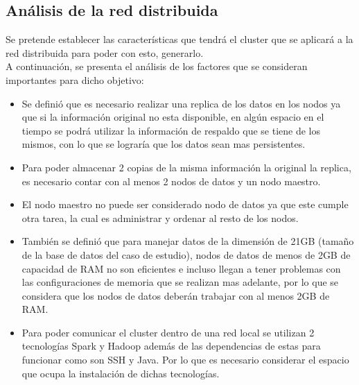 \subsection{Análisis de la red distribuida}
Se pretende establecer las características que tendrá el cluster que se aplicará a la red distribuida para poder con esto, generarlo. 
\\
A continuación, se presenta el análisis de los factores que se consideran importantes para dicho objetivo: 
\\
\begin{itemize}
\item Se definió que es necesario realizar una replica de los datos en los nodos ya que si la información original no esta disponible, en algún espacio en el tiempo se podrá utilizar la información de respaldo que se tiene de los mismos, con lo que se lograría que los datos sean mas persistentes.

\item Para poder almacenar 2 copias de la misma información la original  la replica, es necesario contar con al menos 2 nodos de datos y un nodo maestro. 

\item El nodo maestro no puede ser considerado nodo de datos ya que este cumple otra tarea, la cual es administrar y ordenar al resto de los nodos.

\item También se definió que para manejar datos de la dimensión de 21GB (tamaño de la base de datos del caso de estudio), nodos de datos de menos de 2GB de capacidad de RAM no son eficientes e incluso llegan a tener problemas con las configuraciones de memoria que se realizan mas adelante, por lo que se considera que los nodos de datos deberán trabajar con al menos 2GB de RAM.

\item Para poder comunicar el cluster dentro de una red local se utilizan 2 tecnologías Spark y Hadoop además de las dependencias de estas para funcionar como son SSH y Java. Por lo que es necesario considerar el espacio que ocupa la instalación de dichas tecnologías.

\end{itemize}
